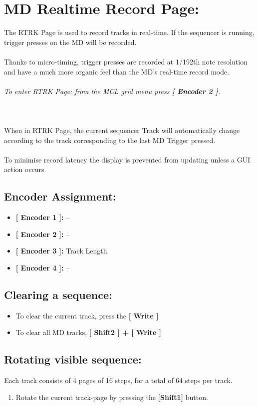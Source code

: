 \chapter{MD Realtime Record Page:}

The RTRK Page is used to record tracks in real-time. If the sequencer is running, trigger presses on the MD will be recorded.\\
\\
Thanks to micro-timing, trigger presses are recorded at 1/192th note resolution and have a much more organic feel than the MD’s real-time record mode.\\\\
\textit{To enter RTRK Page: from the MCL grid menu press \textbf{[ Encoder 2 ]}.}\\
\\
\\
\\
When in RTRK Page, the current sequencer Track will automatically change according to the track corresponding to the last MD Trigger pressed.\\
\\To minimise record latency the display is prevented from updating unless a GUI action occurs. 
\section{Encoder Assignment:}
\begin{itemize}
	\item \textbf{[ Encoder 1 ]: } --
	\item \textbf{[ Encoder 2 ]: } --
	\item \textbf{[ Encoder 3 ]: } Track Length
	\item \textbf{[ Encoder 4 ]: } --
\end{itemize}
\section{Clearing a sequence:}
\begin{itemize}
	\item To clear the current track, press the\textbf{ [ Write ]}
	\item To clear all MD tracks,  \textbf{[ Shift2 ] + [ Write ]}
\end{itemize}
\section{Rotating visible sequence:}
Each track consists of 4 pages of 16 steps, for a total of 64 steps per track.
\begin{enumerate}
	\item Rotate the current track-page by pressing the \textbf{[Shift1] }button.
\end{enumerate}
